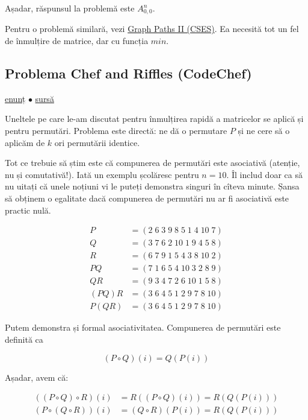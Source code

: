 \documentclass[../main.tex]{subfiles}
\begin{document}
Așadar, răspunsul la problemă este $A^n_{0,0}$.

Pentru o problemă similară, vezi \href{https://cses.fi/problemset/task/1724}{Graph Paths II (CSES)}. Ea necesită tot un fel de înmulțire de matrice, dar cu funcția $min$.

\subsection{Problema Chef and Riffles (CodeChef)}
\label{problem:riffles}

\href{https://www.codechef.com/problems/RIFFLES}{enunț}
$\bullet$
\hyperref[code:riffles]{sursă}

Uneltele pe care le-am discutat pentru înmulțirea rapidă a matricelor se aplică și pentru permutări. Problema este directă: ne dă o permutare $P$ și ne cere să o aplicăm de $k$ ori permutării identice.

Tot ce trebuie să știm este că compunerea de permutări este asociativă (atenție, nu și comutativă!). Iată un exemplu școlăresc pentru $n = 10$. Îl includ doar ca să nu uitați că unele noțiuni vi le puteți demonstra singuri în cîteva minute. Șansa să obținem o egalitate dacă compunerea de permutări nu ar fi asociativă este practic nulă.

\begin{align*}
  P &= (2\; 6\; 3\; 9\; 8\; 5\; 1\; 4\; 10\; 7) \\
  Q &= (3\; 7\; 6\; 2\; 10\; 1\; 9\; 4\; 5\; 8) \\
  R &= (6\; 7\; 9\; 1\; 5\; 4\; 3\; 8\; 10\; 2) \\
  PQ &= (7\; 1\; 6\; 5\; 4\; 10\; 3\; 2\; 8\; 9) \\
  QR &= (9\; 3\; 4\; 7\; 2\; 6\; 10\; 1\; 5\; 8) \\
  (PQ)R &= (3\; 6\; 4\; 5\; 1\; 2\; 9\; 7\; 8\; 10) \\
  P(QR) &= (3\; 6\; 4\; 5\; 1\; 2\; 9\; 7\; 8\; 10)
\end{align*}

Putem demonstra și formal asociativitatea. Compunerea de permutări este definită ca

$$(P \circ Q)(i) = Q(P(i))$$

Așadar, avem că:

\begin{align*}
  ((P \circ Q) \circ R)(i) &= R((P \circ Q)(i)) = R(Q(P(i))) \\
  (P \circ (Q \circ R))(i) &= (Q \circ R)(P(i)) = R(Q(P(i)))
\end{align*}
\end{document}

